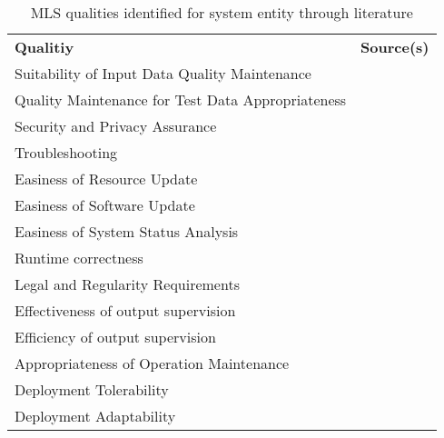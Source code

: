 \begin{table}[h]\label{tb:LiteratureQualitiesSystem}
    \centering
    \begin{tabular}{p{} p{}}
        \textbf{Qualitiy} & \textbf{Source(s)} \\
        Suitability of Input Data Quality Maintenance &~\cite{nakamichi_requirements-driven_2020} \\
        Quality Maintenance for Test Data Appropriateness&~\cite{nakamichi_requirements-driven_2020}\\
        Security and Privacy Assurance&~\cite{nakamichi_requirements-driven_2020,zhang_machine_2020}\\
        Troubleshooting &~\cite{arpteg_software_2018} \\
        Easiness of Resource Update &~\cite{nakamichi_requirements-driven_2020} \\
        Easiness of Software Update &~\cite{nakamichi_requirements-driven_2020} \\
        Easiness of System Status Analysis &~\cite{nakamichi_requirements-driven_2020} \\
        Runtime correctness &~\cite{siebert_construction_2021} \\
        Legal and Regularity Requirements &~\cite{vogelsang_requirements_2019} \\
        Effectiveness of output supervision &~\cite{siebert_construction_2021} \\
        Efficiency of output supervision &~\cite{siebert_construction_2021} \\
        Appropriateness of Operation Maintenance &~\cite{nakamichi_requirements-driven_2020} \\
        Deployment Tolerability &~\cite{ashmore_assuring_2021} \\
        Deployment Adaptability &~\cite{ashmore_assuring_2021} \\
    \end{tabular}
    \caption{\ac{MLS} qualities identified for system entity through literature}
\end{table}
